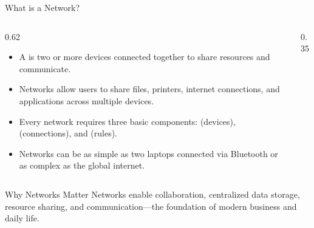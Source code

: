 \documentclass[aspectratio=169]{beamer}  %
\begin{document}
\begin{frame}{What is a Network?}
    \begin{columns}[T]
        \begin{column}{0.62\textwidth}
            \begin{itemize}
                \item A  is two or more devices connected together to share resources and communicate.
                \item Networks allow users to share files, printers, internet connections, and applications across multiple devices.
                \item Every network requires three basic components:  (devices),  (connections), and  (rules).
                \item Networks can be as simple as two laptops connected via Bluetooth or as complex as the global internet.
            \end{itemize}
        \end{column}
        \begin{column}{0.35\textwidth}
            \begin{center}
            \end{center}
        \end{column}
    \end{columns}
    
    \begin{block}{Why Networks Matter}
        Networks enable collaboration, centralized data storage, resource sharing, and communication---the foundation of modern business and daily life.
    \end{block}
\end{frame}
\end{document}
